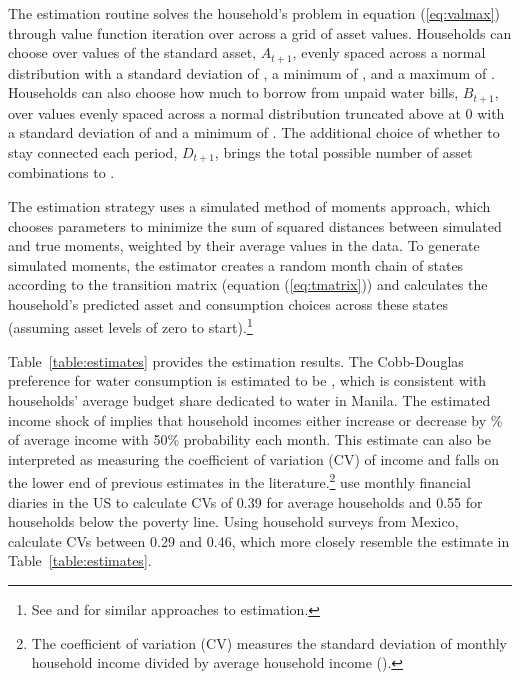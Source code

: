 \documentclass[12pt]{article}
\begin{document}
The estimation routine solves the household's problem in equation (\ref{eq:valmax}) through value function iteration over across a grid of asset values.  Households can choose over values of the standard asset, $A_{t+1}$, evenly spaced across a normal distribution with a standard deviation of \unskip, a minimum of \unskip, and a maximum of \unskip.  Households can also choose how much to borrow from unpaid water bills, $B_{t+1}$, over values evenly spaced across a normal distribution truncated above at 0 with a standard deviation of  and a minimum of \unskip.  The additional choice of whether to stay connected each period, $D_{t+1}$, brings the total possible number of asset combinations to \unskip.  

The estimation strategy uses a simulated method of moments approach, which chooses parameters to minimize the sum of squared distances between simulated and true moments, weighted by their average values in the data.  To generate simulated moments, the estimator creates a random month chain of states according to the transition matrix (equation (\ref{eq:tmatrix})) and calculates the household's predicted asset and consumption choices across these states (assuming asset levels of zero to start).\footnote{See \cite{laibson2007estimating} and \cite{gourinchas2002consumption} for similar approaches to estimation.}

Table~\ref{table:estimates} provides the estimation results.  The Cobb-Douglas preference for water consumption is estimated to be \unskip, which is consistent with households' average budget share dedicated to water in Manila.  The estimated income shock of implies that household incomes either increase or decrease by \unskip\% of average income with 50\% probability each month.  This estimate can also be interpreted as measuring the coefficient of variation (CV) of income and falls on the lower end of previous estimates in the literature.\footnote{The coefficient of variation (CV) measures the standard deviation of monthly household income divided by average household income (\cite{hannagan2015income}).}  \cite{hannagan2015income} use monthly financial diaries in the US to calculate CVs of 0.39 for average households and 0.55 for households below the poverty line.  Using household surveys from Mexico, \cite{amuedo2011remittances} calculate CVs between 0.29 and 0.46, which more closely resemble the estimate in Table~\ref{table:estimates}.
\end{document}
